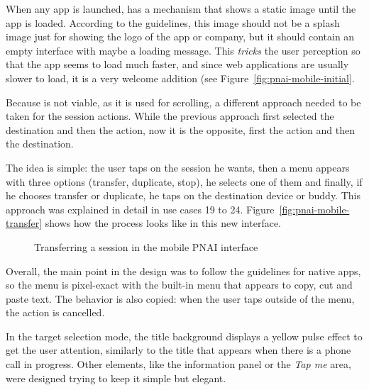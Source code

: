 When any app is launched,  has a mechanism that shows a static image until the app is loaded.
According to the guidelines, this image should not be a splash image just for showing the logo of the app or company, but it should contain an empty interface with maybe a loading message.
This \emph{tricks} the user perception so that the app seems to load much faster, and since web applications are usually slower to load, it is a very welcome addition (see Figure~\vref{fig:pnai-mobile-initial}.

Because  is not viable, as it is used for scrolling, a different approach needed to be taken for the session actions.
While the previous approach first selected the destination and then the action, now it is the opposite, first the action and then the destination.

The idea is simple: the user taps on the session he wants, then a menu appears with three options (transfer, duplicate, stop), he selects one of them and finally, if he chooses transfer or duplicate, he taps on the destination device or buddy.
This approach was explained in detail in use cases 19 to 24.
Figure~\vref{fig:pnai-mobile-transfer} shows how the process looks like in this new interface.

\begin{figure}[htbp]
  \centering
  \caption{Transferring a session in the mobile PNAI interface}
  \label{fig:pnai-mobile-transfer}
\end{figure}

Overall, the main point in the design was to follow the  guidelines for native apps, so the menu is pixel-exact with the built-in menu that appears to copy, cut and paste text.
The behavior is also copied: when the user taps outside of the menu, the action is cancelled.

In the target selection mode, the title background displays a yellow pulse effect to get the user attention, similarly to the title that appears when there is a phone call in progress.
Other elements, like the information panel or the \emph{Tap me} area, were designed trying to keep it simple but elegant.

